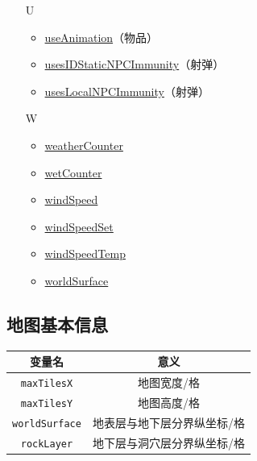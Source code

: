 \begin{multicols}{2}[]
{\begin{itemize}
\begin{itemize}
	\item \hyperref[tab4618]{safeRangeX}
	\item \hyperref[tab4618]{safeRangeY}
	\item \hyperref[tab9]{sHeight}
	\item \hyperref[tab4618]{spawnRangeX}
	\item \hyperref[tab4618]{spawnRangeY}
	\item \hyperref[tab10]{stuckAmount}
	\item \hyperref[tab10]{stuckCount}
	\item \hyperref[tab9]{sWidth}
	\end{itemize}
\item[U] \begin{itemize}
	\item \hyperref[sec28]{useAnimation}（物品）
	\item \hyperref[sec25]{usesIDStaticNPCImmunity}（射弹）
	\item \hyperref[sec25]{usesLocalNPCImmunity}（射弹）
	\end{itemize}
\item[W] \begin{itemize}
	\item \href{https://www.bbstr.net/threads/133/#post-623}{weatherCounter}
	\item \hyperref[tab10]{wetCounter}
	\item \href{https://www.bbstr.net/threads/133/#post-623}{windSpeed}
	\item \href{https://www.bbstr.net/threads/133/#post-623}{windSpeedSet}
	\item \href{https://www.bbstr.net/threads/133/#post-623}{windSpeedTemp}
	\item \hyperref[tab8]{worldSurface}
	\end{itemize}
\end{itemize}
}
\end{multicols}

\subsection{地图基本信息}\label{tab8}
\begin{longtable}{|c|c|}
\hline 变量名&意义\\\hline
\endhead
\hline
\endfoot
{\lstinline!maxTilesX!}&地图宽度/格\\\hline
{\lstinline!maxTilesY!}&地图高度/格\\\hline
{\lstinline!worldSurface!}&地表层与地下层分界纵坐标/格\\\hline
{\lstinline!rockLayer!}&地下层与洞穴层分界纵坐标/格\\
\end{longtable}


